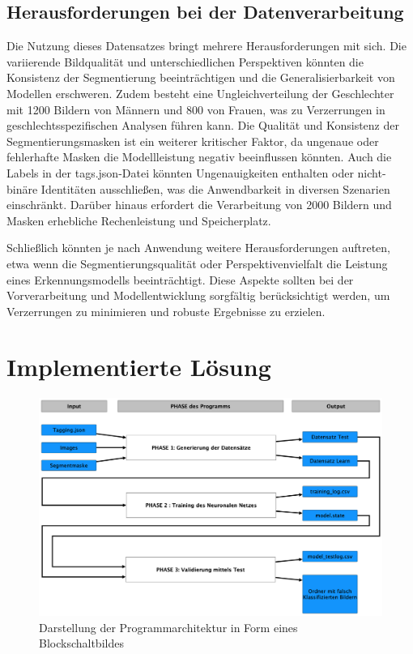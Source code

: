 \documentclass[journal,twoside,web]{ieeecolor}
\begin{document}
\subsection{Herausforderungen bei der Datenverarbeitung}  
Die Nutzung dieses Datensatzes bringt mehrere Herausforderungen mit sich. Die variierende Bildqualität und unterschiedlichen Perspektiven könnten die Konsistenz der Segmentierung beeinträchtigen und die Generalisierbarkeit von Modellen erschweren. Zudem besteht eine Ungleichverteilung der Geschlechter mit 1200 Bildern von Männern und 800 von Frauen, was zu Verzerrungen in geschlechtsspezifischen Analysen führen kann. Die Qualität und Konsistenz der Segmentierungsmasken ist ein weiterer kritischer Faktor, da ungenaue oder fehlerhafte Masken die Modellleistung negativ beeinflussen könnten. Auch die Labels in der tags.json-Datei könnten Ungenauigkeiten enthalten oder nicht-binäre Identitäten ausschließen, was die Anwendbarkeit in diversen Szenarien einschränkt. Darüber hinaus erfordert die Verarbeitung von 2000 Bildern und Masken erhebliche Rechenleistung und Speicherplatz. 

Schließlich könnten je nach Anwendung weitere Herausforderungen auftreten, etwa wenn die Segmentierungsqualität oder Perspektivenvielfalt die Leistung eines Erkennungsmodells beeinträchtigt. Diese Aspekte sollten bei der Vorverarbeitung und Modellentwicklung sorgfältig berücksichtigt werden, um Verzerrungen zu minimieren und robuste Ergebnisse zu erzielen.

\section{Implementierte Lösung}

\begin{figure}[H]
    \centerline{\includegraphics[width=\columnwidth]{Architektur.png}}
    \caption{Darstellung der Programmarchitektur in Form eines Blockschaltbildes}
    \label{fig:architecture}
\end{figure}
\end{document}
